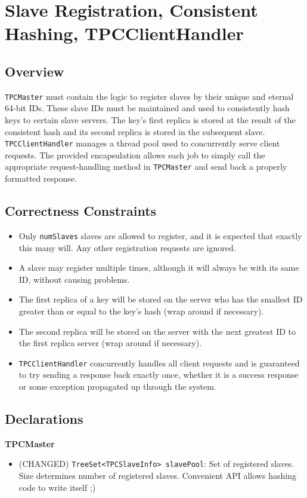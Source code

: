 \section{Slave Registration, Consistent Hashing, TPCClientHandler}
\subsection{Overview}
\texttt{TPCMaster} must contain the logic to register slaves by their unique and eternal 64-bit IDs. These slave IDs must be maintained and used to consistently hash keys to certain slave servers. The key's first replica is stored at the result of the consistent hash and its second replica is stored in the subsequent slave. \texttt{TPCClientHandler} manages a thread pool used to concurrently serve client requests. The provided encapsulation allows each job to simply call the appropriate request-handling method in \texttt{TPCMaster} and send back a properly formatted response.
\subsection{Correctness Constraints}
\begin{itemize}
\item Only \texttt{numSlaves} slaves are allowed to register, and it is expected that exactly this many will. Any other registration requests are ignored.
\item A slave may register multiple times, although it will always be with its same ID, without causing problems.
\item The first replica of a key will be stored on the server who has the smallest ID greater than or equal to the key's hash (wrap around if necessary).
\item The second replica will be stored on the server with the next greatest ID to the first replica server (wrap around if necessary).
\item \texttt{TPCClientHandler} concurrently handles all client requests and is guaranteed to try sending a response back exactly once, whether it is a success response or some exception propagated up through the system.
\end{itemize}
\subsection{Declarations}
\textbf{TPCMaster}
\begin{itemize}
\item (CHANGED) \texttt{TreeSet<TPCSlaveInfo> slavePool}: Set of registered slaves. Size determines number of registered slaves. Convenient API allows hashing code to write itself ;)
\end{itemize}
